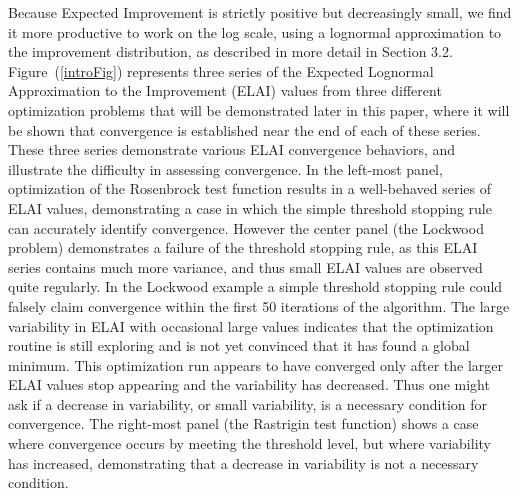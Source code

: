 \documentclass[12pt]{article}
\begin{document}
Because Expected Improvement is strictly positive but decreasingly small,
we find it more productive to work on the log scale, using a lognormal
approximation to the improvement distribution, as described in more
detail in Section 3.2.
%
Figure~(\ref{introFig}) represents three series of the Expected
Lognormal Approximation to the Improvement (ELAI) values from three
different optimization problems that will be demonstrated later in
this paper, where it will be shown that convergence is established near
the end of each of these series.
These three series demonstrate various ELAI convergence behaviors, and
illustrate the difficulty in assessing convergence.  
%
In the left-most panel, optimization of the Rosenbrock test function 
results in a well-behaved series of ELAI values, demonstrating a case in 
which the simple threshold stopping rule can accurately identify convergence.
However the center panel (the Lockwood problem) demonstrates a failure of 
the threshold stopping rule, as this ELAI series contains much more 
variance, and thus small ELAI values are observed quite regularly.
In the Lockwood example a simple threshold stopping rule could falsely
claim convergence within the first 50 iterations of the algorithm.
%
The large variability in ELAI with occasional large values indicates that 
the optimization routine is still exploring and is not yet convinced that 
it has found a global minimum.
This optimization run appears to have converged only after the
larger ELAI values stop appearing and the variability has decreased.
%
Thus one might ask if a decrease in variability, or small variability,
is a necessary condition for convergence.  
%
The right-most panel (the Rastrigin test function) 
shows a case where convergence occurs by meeting the threshold level,
but where variability has increased, demonstrating that a decrease in
variability is not a necessary condition.
\end{document}

